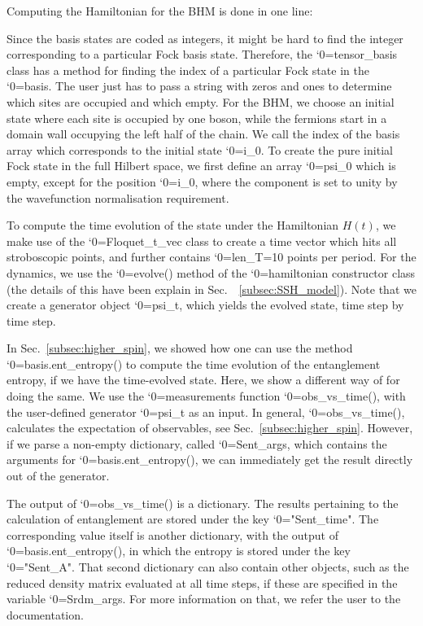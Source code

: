 \documentclass{SciPost}
\newcommand\0{\scalebox{-1}[1]{0}}
\let\svttfamily\ttfamily
\renewcommand\ttfamily{\svttfamily\catcode`0=\active }
\renewcommand\texttt{\bgroup\ttfamily\texttthelp}
\def\texttthelp#1{#1\egroup}
\newcommand{\BFMcode}{example10.py}
\begin{document}

Computing the Hamiltonian for the BHM is done in one line:
 
Since the basis states are coded as integers, it might be hard to find the integer corresponding to a particular Fock basis state. Therefore, the \texttt{tensor\_basis} class has a method for finding the index of a particular Fock state in the \texttt{basis}. The user just has to pass a string with zeros and ones to determine which sites are occupied and which empty. For the BHM, we choose an initial state where each site is occupied by one boson, while the fermions start in a domain wall occupying the left half of the chain. We call the index of the basis array which corresponds to the initial state \texttt{i\_0}. To create the pure initial Fock state in the full Hilbert space, we first define an array \texttt{psi\_0} which is empty, except for the position \texttt{i\_0}, where the component is set to unity by the wavefunction normalisation requirement.
 
To compute the time evolution of the state under the Hamiltonian $H(t)$, we make use of the \texttt{Floquet\_t\_vec} class to create a time vector which hits all stroboscopic points, and further contains \texttt{len\_T=10} points per period. For the dynamics, we use the \texttt{evolve()} method of the \texttt{hamiltonian} constructor class (the details of this have been explain in Sec.~~\ref{subsec:SSH_model}). Note that we create a generator object \texttt{psi\_t}, which yields the evolved state, time step by time step.
 
In Sec.~\ref{subsec:higher_spin}, we showed how one can use the method \texttt{basis.ent\_entropy()} to compute the time evolution of the entanglement entropy, if we have the time-evolved state. Here, we show a different way of for doing the same. We use the \texttt{measurements} function \texttt{obs\_vs\_time()}, with the user-defined generator \texttt{psi\_t} as an input. In general, \texttt{obs\_vs\_time()}, calculates the expectation of observables, see Sec.~\ref{subsec:higher_spin}. However, if we parse a non-empty dictionary, called \texttt{Sent\_args}, which contains the arguments for \texttt{basis.ent\_entropy()}, we can immediately get the result directly out of the generator. 
 
The output of \texttt{obs\_vs\_time()} is a dictionary. The results pertaining to the calculation of entanglement
are stored under the key \texttt{"Sent\_time"}. The corresponding value itself is another dictionary, with the output of \texttt{basis.ent\_entropy()}, in which the entropy is stored under the key \texttt{"Sent\_A"}. That second dictionary can also contain other objects, such as the reduced density matrix evaluated at all time steps, if these are specified in the variable \texttt{Srdm\_args}. For more information on that, we refer the user to the documentation.

 
\end{document}
